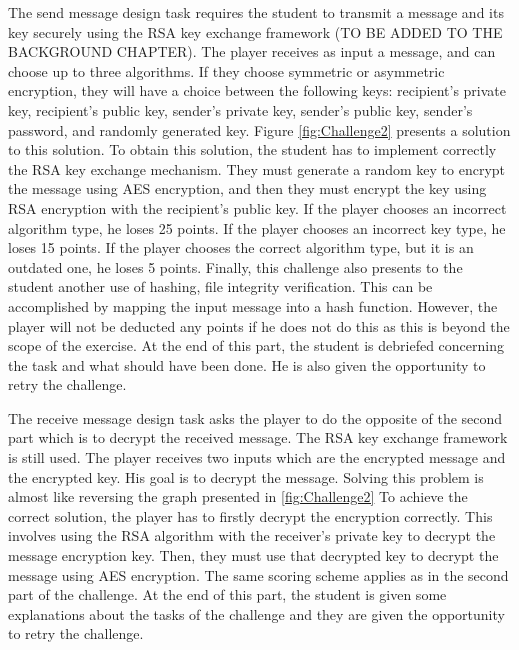\documentclass{l4proj}
\begin{document}
The send message design task requires the student to transmit a message and its key securely using
the RSA key exchange framework (TO BE ADDED TO THE BACKGROUND CHAPTER). 
The player receives as input a message, and can choose up to three algorithms. 
If they choose symmetric or asymmetric encryption, they will have a choice between the following keys:
recipient's private key, recipient's public key, sender's private key, sender's public key, 
sender's password, and randomly generated key. 
Figure \ref{fig:Challenge2} presents a solution to this solution. To obtain this solution,
the student has to implement correctly the RSA key exchange mechanism. 
They must generate a random key to encrypt the message using AES encryption, 
and then they must encrypt the key using RSA encryption with the recipient's public key.
If the player chooses an incorrect algorithm type, he loses 25 points. 
If the player chooses an incorrect key type, he loses 15 points.
If the player chooses the correct algorithm type, but it is an outdated one, he loses 5 points. 
Finally, this challenge also presents to the student another use of hashing, file integrity verification.
This can be accomplished by mapping the input message into a hash function.
However, the player will not be deducted any points if he does not do this 
as this is beyond the scope of the exercise.
At the end of this part, the student is debriefed concerning the task and what should have been done.
He is also given the opportunity to retry the challenge.

The receive message design task asks the player to do the opposite of the second part which
is to decrypt the received message. The RSA key exchange framework is still used.
The player receives two inputs which are the encrypted message and the encrypted key.
His goal is to decrypt the message.
Solving this problem is almost like reversing the graph presented in \ref{fig:Challenge2}
To achieve the correct solution, the player has to firstly decrypt the encryption correctly.
This involves using the RSA algorithm with the receiver's private key to decrypt the message encryption key.
Then, they must use that decrypted key to decrypt the message using AES encryption.
The same scoring scheme applies as in the second part of the challenge. 
At the end of this part, the student is given some explanations about the tasks of the challenge and
they are given the opportunity to retry the challenge.
\end{document}

